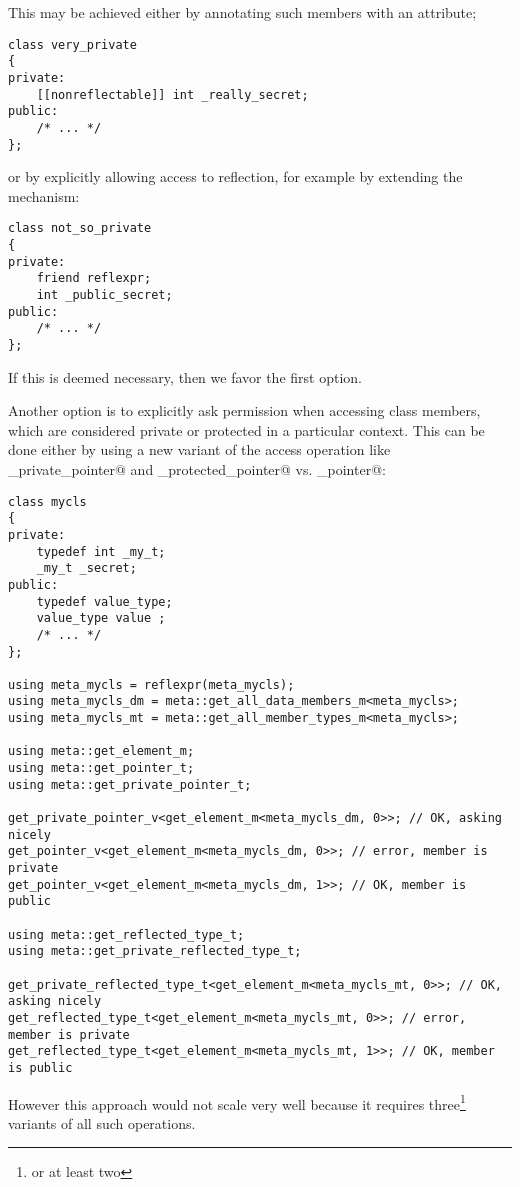 This may be achieved either by annotating such members with an attribute;

\begin{verbatim}
class very_private
{
private:
	[[nonreflectable]] int _really_secret;
public:
	/* ... */
};
\end{verbatim}

or by explicitly allowing access to reflection, for example by extending
the \verb@friend@ mechanism:

\begin{verbatim}
class not_so_private
{
private:
	friend reflexpr;
	int _public_secret;
public:
	/* ... */
};
\end{verbatim}

If this is deemed necessary, then we favor the first option.

Another option is to explicitly ask permission when accessing class members,
which are considered private or protected in a particular context.
This can be done either by using a new variant of the access operation
like \verb@get_private_pointer@ and \verb@get_protected_pointer@
vs. \verb@get_pointer@:

\begin{verbatim}
class mycls
{
private:
	typedef int _my_t;
	_my_t _secret;
public:
	typedef value_type;
	value_type value ;
	/* ... */
};

using meta_mycls = reflexpr(meta_mycls);
using meta_mycls_dm = meta::get_all_data_members_m<meta_mycls>;
using meta_mycls_mt = meta::get_all_member_types_m<meta_mycls>;

using meta::get_element_m;
using meta::get_pointer_t;
using meta::get_private_pointer_t;

get_private_pointer_v<get_element_m<meta_mycls_dm, 0>>; // OK, asking nicely
get_pointer_v<get_element_m<meta_mycls_dm, 0>>; // error, member is private
get_pointer_v<get_element_m<meta_mycls_dm, 1>>; // OK, member is public

using meta::get_reflected_type_t;
using meta::get_private_reflected_type_t;

get_private_reflected_type_t<get_element_m<meta_mycls_mt, 0>>; // OK, asking nicely
get_reflected_type_t<get_element_m<meta_mycls_mt, 0>>; // error, member is private
get_reflected_type_t<get_element_m<meta_mycls_mt, 1>>; // OK, member is public
\end{verbatim}

However this approach would not scale very well because it requires three\footnote
{or at least two} variants of all such operations.

